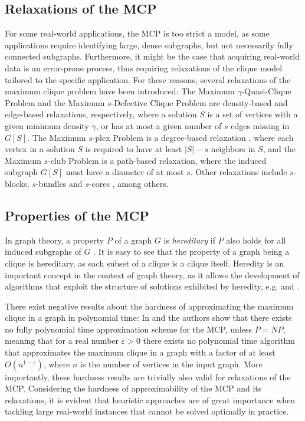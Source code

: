 \documentclass[draft,final]{vutinfth} %
\begin{document}
\subsection{Relaxations of the MCP}

For some real-world applications, the MCP is too strict a model, as some applications require identifying large, dense subgraphs, but not necessarily fully connected subgraphs. 
Furthermore, it might be the case that acquiring real-world data is an error-prone process, thus requiring relaxations of the clique model tailored to the specific application. 
For these reasons, several relaxations of the maximum clique problem have been introduced: The Maximum $\gamma$-Quasi-Clique Problem \cite{Abello2002} and the Maximum $s$-Defective Clique Problem \cite{Yu2006} are density-based and edge-based relaxations, respectively, where a solution $S$ is a set of vertices with a given minimum density $\gamma$, or has at most a given number of $s$ edges missing in $G[S]$. 
The Maximum $s$-plex Problem is a degree-based relaxation \cite{Seidman1978}, where each vertex in a solution $S$ is required to have at least $|S| - s$ neighbors in $S$, and the Maximum $s$-club Problem \cite{Mokken1979} is a path-based relaxation, where the induced subgraph $G[S]$ must have a diameter of at most $s$. Other relaxations include $s$-blocks, $s$-bundles and $s$-cores \cite{Gschwind2015}, among others. 

\subsection{Properties of the MCP}

In graph theory, a property $P$ of a graph $G$ is \textit{hereditary} if $P$ also holds for all induced subgraphs of $G$ \cite{pattillo_maximum_2013}. It is easy to see that the property of a graph being a clique is hereditary, as each subset of a clique is a clique itself. Heredity is an important concept in the context of graph theory, as it allows the development of algorithms that exploit the structure of solutions exhibited by heredity, e.g. \cite{Trukhanov2013} and \cite{GSCHWIND2018131}.  

There exist negative results about the hardness of approximating the maximum clique in a graph in polynomial time: In \cite{Hastad1999} and \cite{Zuckerman2007} the authors show that there exists no fully polynomial time approximation scheme for the MCP, unless $\mathit{P} = \mathit{NP}$, meaning that for a real number $\varepsilon > 0$ there exists no polynomial time algorithm that approximates the maximum clique in a graph with a factor of at least $O(n^{1-\varepsilon})$, where $n$ is the number of vertices in the input graph. More importantly, these hardness results are trivially also valid for relaxations of the MCP. Considering the hardness of approximability of the MCP and its relaxations, it is evident that heuristic approaches are of great importance when tackling large real-world instances that cannot be solved optimally in practice. 
\end{document}
